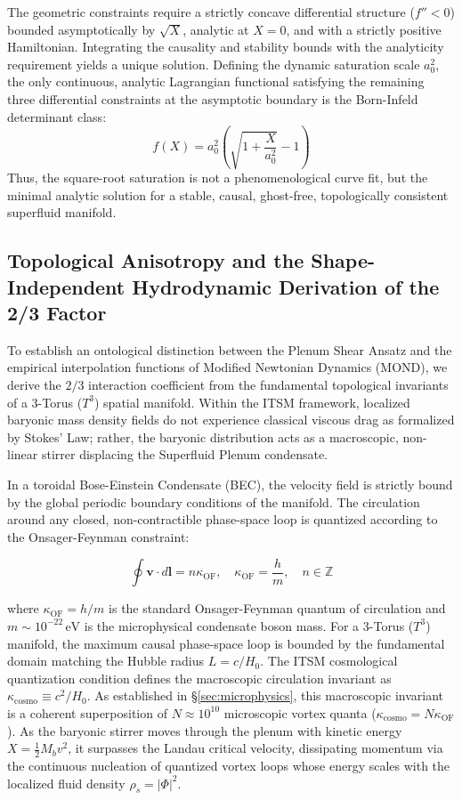 \documentclass[aps,prd,10pt,twocolumn,superscriptaddress,nofootinbib,floatfix]{revtex4-2}
\begin{document}
The geometric constraints require a strictly concave differential structure ($f'' < 0$) bounded asymptotically by $\sqrt{X}$, analytic at $X=0$, and with a strictly positive Hamiltonian. Integrating the causality and stability bounds with the analyticity requirement yields a unique solution. Defining the dynamic saturation scale $a_0^2$, the only continuous, analytic Lagrangian functional satisfying the remaining three differential constraints at the asymptotic boundary is the Born-Infeld determinant class:
\begin{equation}
f(X) = a_0^2 \left(\sqrt{1+\frac{X}{a_0^2}} - 1\right)
\end{equation}
Thus, the square-root saturation is not a phenomenological curve fit, but the minimal analytic solution for a stable, causal, ghost-free, topologically consistent superfluid manifold.
\subsection{\label{sec:projection}Topological Anisotropy and the Shape-Independent Hydrodynamic Derivation of the 2/3 Factor}

To establish an ontological distinction between the Plenum Shear Ansatz and the empirical interpolation functions of Modified Newtonian Dynamics (MOND), we derive the $2/3$ interaction coefficient from the fundamental topological invariants of a 3-Torus ($T^3$) spatial manifold. Within the ITSM framework, localized baryonic mass density fields do not experience classical viscous drag as formalized by Stokes' Law; rather, the baryonic distribution acts as a macroscopic, non-linear stirrer displacing the Superfluid Plenum condensate.

In a toroidal Bose-Einstein Condensate (BEC), the velocity field is strictly bound by the global periodic boundary conditions of the manifold. The circulation around any closed, non-contractible phase-space loop is quantized according to the Onsager-Feynman constraint:

\begin{equation}
\oint \mathbf{v} \cdot d\mathbf{l} = n \kappa_{\text{OF}}, \quad \kappa_{\text{OF}} = \frac{h}{m}, \quad n \in \mathbb{Z}
\end{equation}

where $\kappa_{\text{OF}} = h/m$ is the standard Onsager-Feynman quantum of circulation and $m \sim 10^{-22}\,\text{eV}$ is the microphysical condensate boson mass. For a 3-Torus ($T^3$) manifold, the maximum causal phase-space loop is bounded by the fundamental domain matching the Hubble radius $L = c/H_0$. The ITSM cosmological quantization condition defines the macroscopic circulation invariant as $\kappa_{\text{cosmo}} \equiv c^2 / H_0$. As established in \S\ref{sec:microphysics}, this macroscopic invariant is a coherent superposition of $N \approx 10^{10}$ microscopic vortex quanta ($\kappa_{\text{cosmo}} = N \kappa_{\text{OF}}$). As the baryonic stirrer moves through the plenum with kinetic energy $X = \frac{1}{2}M_b v^2$, it surpasses the Landau critical velocity, dissipating momentum via the continuous nucleation of quantized vortex loops whose energy scales with the localized fluid density $\rho_s = |\Phi|^2$.
\end{document}
